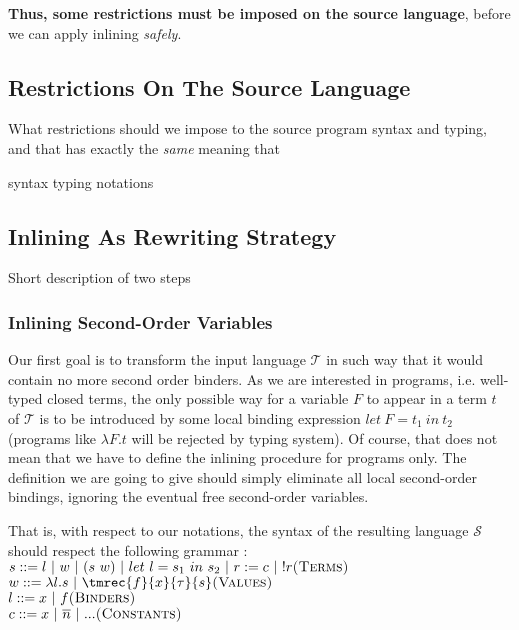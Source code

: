 \documentclass[a4paper,11pt,oneside]{article}
\theoremstyle{plain}
\newcommand{\tmlet}[3]{let~#1=#2~in~#3}
\newcommand{\inlT}{\mathcal{T}}
\newcommand{\inlS}{\mathcal{S}}
\begin{document}
\textbf{Thus, some restrictions must be imposed on the source language}, before we can apply inlining \textit{safely}.



%






\subsection{Restrictions On The Source Language}

What restrictions should we impose to the source program syntax and typing, and that has exactly the \textit{same} meaning that 

syntax typing notations


\subsection{Inlining As Rewriting Strategy}

Short description of two steps
\subsubsection*{Inlining Second-Order Variables}

Our first goal is to transform the input language $\inlT$ in such way that it
would contain no more second order binders. As we are interested in programs, 
i.e. well-typed closed terms, the only possible way for a variable $F$ to 
appear in a term $t$ of $\inlT$ is to be introduced by some local binding 
expression $\tmlet{F}{t_1}{t_2}$ (programs like $\lambda F. t$ will be
rejected by typing system). Of course, that does not mean that we have to define 
the inlining procedure for programs only. The definition we are going to give
should simply eliminate all local second-order bindings, ignoring the eventual
free second-order variables.

That is, with respect to our notations, the syntax of the resulting language
 $\inlS$ should respect the following grammar :\\[1em]\indent 
  $ s ::= l~|~w~|~(s~w) ~|~ \tmlet{l}{s_1}{s_2} ~|~ r:= c ~|~ !r \hfill \textsc{(Terms)}$ \\\indent 
  $ w ::= \lambda l. s ~|~ \tmrec{f}{x}{\tau}{s}\hfill \textsc{(Values)}$ \\\indent 
  $ l ::= x ~|~ f \hfill \textsc{(Binders)}$ \\\indent 
  $ c ::= x ~|~ \overline{n}~|~... \hfill \textsc{(Constants)}$\\[1em]
\end{document}
